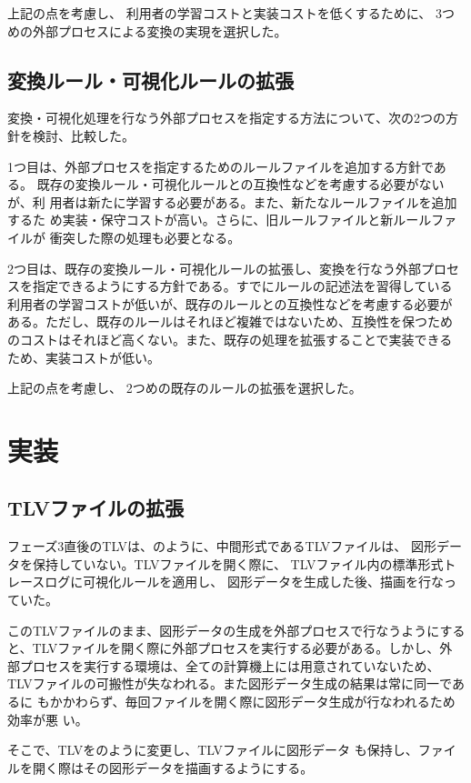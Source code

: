 上記の点を考慮し、
利用者の学習コストと実装コストを低くするために、
3つめの外部プロセスによる変換の実現を選択した。

\subsection{変換ルール・可視化ルールの拡張}
変換・可視化処理を行なう外部プロセスを指定する方法について、次の2つの方
針を検討、比較した。

1つ目は、外部プロセスを指定するためのルールファイルを追加する方針である。
既存の変換ルール・可視化ルールとの互換性などを考慮する必要がないが、利
用者は新たに学習する必要がある。また、新たなルールファイルを追加するた
め実装・保守コストが高い。さらに、旧ルールファイルと新ルールファイルが
衝突した際の処理も必要となる。

2つ目は、既存の変換ルール・可視化ルールの拡張し、変換を行なう外部プロセ
スを指定できるようにする方針である。すでにルールの記述法を習得している
利用者の学習コストが低いが、既存のルールとの互換性などを考慮する必要が
ある。ただし、既存のルールはそれほど複雑ではないため、互換性を保つため
のコストはそれほど高くない。また、既存の処理を拡張することで実装できる
ため、実装コストが低い。

上記の点を考慮し、
2つめの既存のルールの拡張を選択した。

\section{実装}
\subsection{TLVファイルの拡張}
フェーズ3直後のTLVは、のように、中間形式であるTLVファイルは、
図形データを保持していない。TLVファイルを開く際に、
TLVファイル内の標準形式トレースログに可視化ルールを適用し、
図形データを生成した後、描画を行なっていた。

このTLVファイルのまま、図形データの生成を外部プロセスで行なうようにする
と、TLVファイルを開く際に外部プロセスを実行する必要がある。しかし、外
部プロセスを実行する環境は、全ての計算機上には用意されていないため、
TLVファイルの可搬性が失なわれる。また図形データ生成の結果は常に同一であるに
もかかわらず、毎回ファイルを開く際に図形データ生成が行なわれるため効率が悪
い。

そこで、TLVをのように変更し、TLVファイルに図形データ
も保持し、ファイルを開く際はその図形データを描画するようにする。

